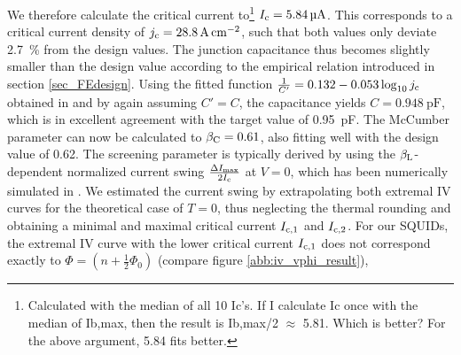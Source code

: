 
We therefore calculate the critical current to\footnote{Calculated with the median of all 10 Ic's. If I calculate Ic once with the median of Ib,max, then the result is Ib,max/2 $\approx$ 5.81. Which is better? For the above argument, 5.84 fits better.} $I_{\rm c}=\qty{5.84}{\micro\ampere}$. This corresponds to a critical current density of $j_{\rm c}=\qty{28.8}{\ampere\per\centi\meter\squared}$, such that both values only deviate \qty{2.7}{\percent} from the design values. The junction capacitance thus becomes slightly smaller than the design value according to the empirical relation introduced in section \ref{sec_FEdesign}. Using the fitted function $\frac{1}{C'}=0.132-0.053\log_{10}j_{\rm c}$ obtained in \cite{Bauer2022} and by again assuming $C'=C$, the capacitance yields $C=\qty{0.948}{\pico\farad}$, which is in excellent agreement with the target value of \qty{0.95}{\pico\farad}. The McCumber parameter can now be calculated to $\beta_{\rm C}=0.61$, also fitting well with the design value of 0.62. The screening parameter is typically derived by using the $\beta_{\rm L}$-dependent normalized current swing $\frac{\Delta I_{\rm max}}{2I_{\rm c}}$ at $V=0$, which has been numerically simulated in \cite{Tesche1977}. We estimated the current swing by extrapolating both extremal IV curves for the theoretical case of $T=0$, thus neglecting the thermal rounding and obtaining a minimal and maximal critical current $I_{\rm c,1}$ and $I_{\rm c,2}$. For our SQUIDs, the extremal IV curve with the lower critical current $I_{\rm c,1}$ does not correspond exactly to $\Phi = (n+\frac{1}{2}\Phi_0)$ (compare figure \ref{abb:iv_vphi_result}), 
